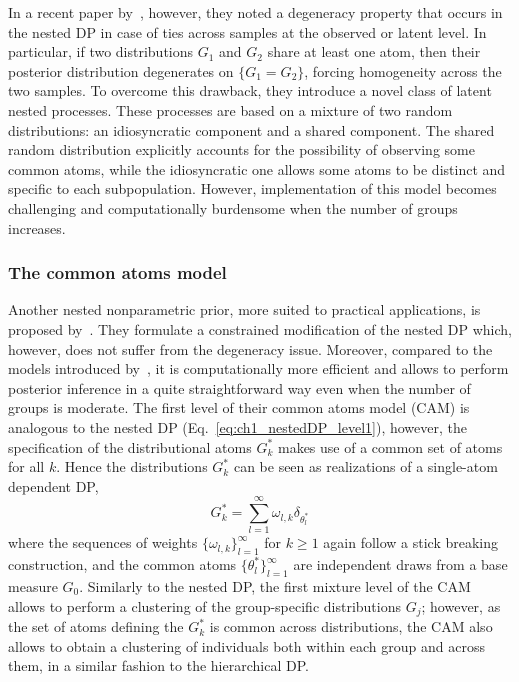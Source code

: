 In a recent paper by~\citet{camerlenghi2019}, however, they noted a degeneracy property that occurs in the nested DP in case of  ties across samples at the observed or latent level.
In particular, if two distributions $G_1$ and $G_2$ share at least one atom, then their posterior distribution degenerates on
$\{G_1=G_2\}$, forcing homogeneity across the two samples. 
To overcome this drawback, they introduce a novel class of latent nested processes.
These processes are based on a mixture of two random distributions: an idiosyncratic component and a shared component. 
The shared random distribution explicitly accounts for the possibility of observing some common atoms, while the idiosyncratic one
allows some atoms to be distinct and specific to each subpopulation.
However, implementation of this model becomes challenging and computationally burdensome when the number of groups increases.

\subsubsection*{The common atoms model}
Another nested nonparametric prior, more suited to practical applications, is proposed by~\citet{denti2021}. They formulate a constrained modification of the nested DP which, however, does not suffer from the degeneracy issue. Moreover, compared to the models introduced by~\citet{camerlenghi2019}, it is computationally more efficient and allows to perform posterior inference in a quite straightforward way even when the number of groups is moderate.
%
The first level of their common atoms model (CAM) is analogous to the nested DP (Eq.~\ref{eq:ch1_nestedDP_level1}), however, the specification of the distributional atoms $G^*_k$ makes use of a common set of atoms for all $k$. Hence the distributions $G^*_k$ can be seen as realizations of a single-atom dependent DP,
\begin{equation*}
G^*_k = \sum_{l=1}^{\infty} \omega_{l,k} \delta_{\theta^*_{l}} 
\end{equation*}
where the sequences of weights $\{\omega_{l,k}\}_{l=1}^{\infty}$ for $k\geq1$ again follow a stick breaking construction, and the common atoms $\{\theta^*_l\}_{l=1}^{\infty}$ are independent draws from a base measure $G_0$.
Similarly to the nested DP, the first mixture level of the CAM allows to perform a clustering of the group-specific distributions $G_j$; however, as the set of atoms defining the $G^*_k$ is common across distributions, the CAM also allows to obtain a clustering of individuals both within each group and across them, in a similar fashion to the hierarchical DP.

